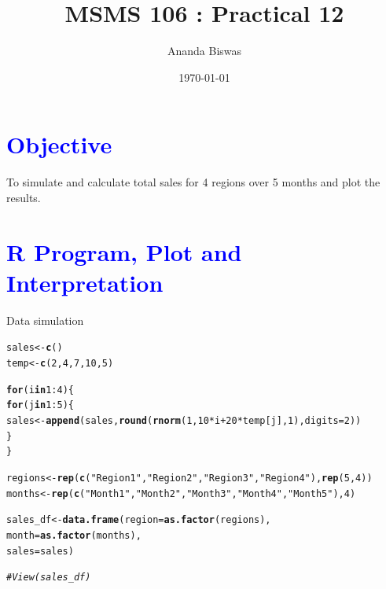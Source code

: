 \documentclass[11pt, a4paper]{article}\usepackage[]{graphicx}\usepackage[]{xcolor}
\title{MSMS 106 : Practical 12}
\author{Ananda Biswas}
\date{\today}
\makeatletter
\newcommand{\hlnum}[1]{\textcolor[rgb]{0.686,0.059,0.569}{#1}}%
\newcommand{\hlsng}[1]{\textcolor[rgb]{0.192,0.494,0.8}{#1}}%
\newcommand{\hlcom}[1]{\textcolor[rgb]{0.678,0.584,0.686}{\textit{#1}}}%
\newcommand{\hlopt}[1]{\textcolor[rgb]{0,0,0}{#1}}%
\newcommand{\hldef}[1]{\textcolor[rgb]{0.345,0.345,0.345}{#1}}%
\newcommand{\hlkwa}[1]{\textcolor[rgb]{0.161,0.373,0.58}{\textbf{#1}}}%
\newcommand{\hlkwb}[1]{\textcolor[rgb]{0.69,0.353,0.396}{#1}}%
\newcommand{\hlkwc}[1]{\textcolor[rgb]{0.333,0.667,0.333}{#1}}%
\newcommand{\hlkwd}[1]{\textcolor[rgb]{0.737,0.353,0.396}{\textbf{#1}}}%
\newenvironment{kframe}{%
 \def\at@end@of@kframe{}%
 \ifinner\ifhmode%
  \def\at@end@of@kframe{\end{minipage}}%
  \begin{minipage}{\columnwidth}%
 \fi\fi%
 \def\FrameCommand##1{\hskip\@totalleftmargin \hskip-\fboxsep
 \colorbox{shadecolor}{##1}\hskip-\fboxsep
     \hskip-\linewidth \hskip-\@totalleftmargin \hskip\columnwidth}%
 \MakeFramed {\advance\hsize-\width
   \@totalleftmargin\z@ \linewidth\hsize
   \@setminipage}}%
 {\par\unskip\endMakeFramed%
 \at@end@of@kframe}
\newenvironment{knitrout}{}{} %
\makeatother
\begin{document}
\maketitle


\section*{\faArrowAltCircleRight[regular] \textcolor{blue}{Objective}}

\hspace{1cm} To simulate and calculate total sales for 4 regions over 5 months and plot the results.




\section*{\faArrowAltCircleRight[regular] \textcolor{blue}{R Program, Plot and Interpretation}}

\leftpointright \hspace{0.2cm} Data simulation
\begin{knitrout}
\color{fgcolor}\begin{kframe}
\begin{alltt}
\hldef{sales} \hlkwb{<-} \hlkwd{c}\hldef{()}
\hldef{temp} \hlkwb{<-} \hlkwd{c}\hldef{(}\hlnum{2}\hldef{,} \hlnum{4}\hldef{,} \hlnum{7}\hldef{,} \hlnum{10}\hldef{,} \hlnum{5}\hldef{)}

\hlkwa{for} \hldef{(i} \hlkwa{in} \hlnum{1}\hlopt{:}\hlnum{4}\hldef{) \{}
  \hlkwa{for} \hldef{(j} \hlkwa{in} \hlnum{1}\hlopt{:}\hlnum{5}\hldef{) \{}
    \hldef{sales} \hlkwb{<-} \hlkwd{append}\hldef{(sales,} \hlkwd{round}\hldef{(}\hlkwd{rnorm}\hldef{(}\hlnum{1}\hldef{,} \hlnum{10}\hlopt{*}\hldef{i} \hlopt{+} \hlnum{20}\hlopt{*}\hldef{temp[j],} \hlnum{1}\hldef{),} \hlkwc{digits} \hldef{=} \hlnum{2}\hldef{))}
  \hldef{\}}
\hldef{\}}

\hldef{regions} \hlkwb{<-} \hlkwd{rep}\hldef{(}\hlkwd{c}\hldef{(}\hlsng{"Region1"}\hldef{,} \hlsng{"Region2"}\hldef{,} \hlsng{"Region3"}\hldef{,} \hlsng{"Region4"}\hldef{),} \hlkwd{rep}\hldef{(}\hlnum{5}\hldef{,} \hlnum{4}\hldef{))}
\hldef{months} \hlkwb{<-} \hlkwd{rep}\hldef{(}\hlkwd{c}\hldef{(}\hlsng{"Month1"}\hldef{,} \hlsng{"Month2"}\hldef{,} \hlsng{"Month3"}\hldef{,} \hlsng{"Month4"}\hldef{,} \hlsng{"Month5"}\hldef{),} \hlnum{4}\hldef{)}

\hldef{sales_df} \hlkwb{<-} \hlkwd{data.frame}\hldef{(}\hlkwc{region} \hldef{=} \hlkwd{as.factor}\hldef{(regions),}
                       \hlkwc{month} \hldef{=} \hlkwd{as.factor}\hldef{(months),}
                       \hlkwc{sales} \hldef{= sales)}

\hlcom{# View(sales_df)}
\end{alltt}
\end{kframe}
\end{knitrout}
\end{document}
